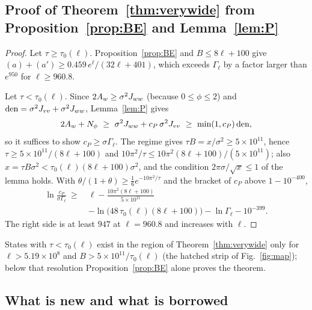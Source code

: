 \subsection{Proof of Theorem~\ref{thm:verywide} from Proposition~\ref{prop:BE} and Lemma~\ref{lem:P}}

\begin{proof}
Let $\tau\ge\tau_0(\ell)$.
Proposition~\ref{prop:BE} and $B\le8\ell+100$ give $(a)+(a')\ge0.459\,e^{\ell}/(32\ell+401)$, which exceeds $\Gamma_\ell$ by a factor larger than $e^{950}$ for $\ell\ge960.8$.

Let $\tau<\tau_0(\ell)$.
Since $2A_w\ge\sigma^2J_{ww}$ (because $0\le\phi\le2$) and $\mathrm{den}=\sigma^2J_{vv}+\sigma^2J_{ww}$, Lemma~\ref{lem:P} gives
\begin{equation}
2A_w+N_\phi\ \ge\ \sigma^2\Jww+c_P\,\sigma^2\Jvv\ \ge\ \min(1,c_P)\,\mathrm{den},
\end{equation}
so it suffices to show $c_P\ge\sigma\Gamma_\ell$.
The regime gives $\tau B=x/\sigma^2\ge5\times10^{11}$, hence $\tau\ge5\times10^{11}/(8\ell+100)$ and $10\pi^2/\tau\le10\pi^2(8\ell+100)/(5\times10^{11})$; also $x=\tau B\sigma^2<\tau_0(\ell)(8\ell+100)\sigma^2$, and the condition $2\pi\sigma/\sqrt x\le1$ of the lemma holds.
With $\theta/(1+\theta)\ge\tfrac16e^{-10\pi^2/\tau}$ and the bracket of $c_P$ above $1-10^{-400}$,
\begin{equation}
\begin{split}
\ln\frac{c_P}{\sigma\Gamma_\ell}\ \ge\ &\ell-\frac{10\pi^2(8\ell+100)}{5\times10^{11}}\\&-\ln\bigl(48\,\tau_0(\ell)(8\ell+100)\bigr)-\ln\Gamma_\ell-10^{-399}.
\end{split}
\end{equation}
The right side is at least $947$ at $\ell=960.8$ and increases with $\ell$.
\end{proof}

States with $\tau<\tau_0(\ell)$ exist in the region of Theorem~\ref{thm:verywide} only for $\ell>5.19\times10^{8}$ and $B>5\times10^{11}/\tau_0(\ell)$ (the hatched strip of Fig.~\ref{fig:map}); below that resolution Proposition~\ref{prop:BE} alone proves the theorem.

\subsection{What is new and what is borrowed}

